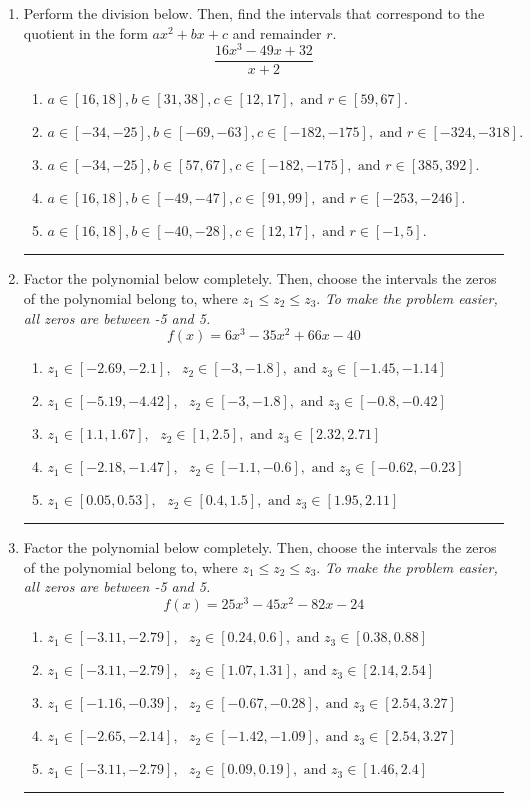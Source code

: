 \documentclass[14pt]{extbook}
\newcommand{\litem}[1]{\item#1\hspace*{-1cm}\rule{\textwidth}{0.4pt}}
\begin{document}
\begin{enumerate}
\litem{
Perform the division below. Then, find the intervals that correspond to the quotient in the form $ax^2+bx+c$ and remainder $r$.\[ \frac{16x^{3} -49 x + 32}{x + 2} \]\begin{enumerate}[label=\Alph*.]
\item \( a \in [16, 18], b \in [31, 38], c \in [12, 17], \text{ and } r \in [59, 67]. \)
\item \( a \in [-34, -25], b \in [-69, -63], c \in [-182, -175], \text{ and } r \in [-324, -318]. \)
\item \( a \in [-34, -25], b \in [57, 67], c \in [-182, -175], \text{ and } r \in [385, 392]. \)
\item \( a \in [16, 18], b \in [-49, -47], c \in [91, 99], \text{ and } r \in [-253, -246]. \)
\item \( a \in [16, 18], b \in [-40, -28], c \in [12, 17], \text{ and } r \in [-1, 5]. \)

\end{enumerate} }
\litem{
Factor the polynomial below completely. Then, choose the intervals the zeros of the polynomial belong to, where $z_1 \leq z_2 \leq z_3$. \textit{To make the problem easier, all zeros are between -5 and 5.}\[ f(x) = 6x^{3} -35 x^{2} +66 x -40 \]\begin{enumerate}[label=\Alph*.]
\item \( z_1 \in [-2.69, -2.1], \text{   }  z_2 \in [-3, -1.8], \text{   and   } z_3 \in [-1.45, -1.14] \)
\item \( z_1 \in [-5.19, -4.42], \text{   }  z_2 \in [-3, -1.8], \text{   and   } z_3 \in [-0.8, -0.42] \)
\item \( z_1 \in [1.1, 1.67], \text{   }  z_2 \in [1, 2.5], \text{   and   } z_3 \in [2.32, 2.71] \)
\item \( z_1 \in [-2.18, -1.47], \text{   }  z_2 \in [-1.1, -0.6], \text{   and   } z_3 \in [-0.62, -0.23] \)
\item \( z_1 \in [0.05, 0.53], \text{   }  z_2 \in [0.4, 1.5], \text{   and   } z_3 \in [1.95, 2.11] \)

\end{enumerate} }
\litem{
Factor the polynomial below completely. Then, choose the intervals the zeros of the polynomial belong to, where $z_1 \leq z_2 \leq z_3$. \textit{To make the problem easier, all zeros are between -5 and 5.}\[ f(x) = 25x^{3} -45 x^{2} -82 x -24 \]\begin{enumerate}[label=\Alph*.]
\item \( z_1 \in [-3.11, -2.79], \text{   }  z_2 \in [0.24, 0.6], \text{   and   } z_3 \in [0.38, 0.88] \)
\item \( z_1 \in [-3.11, -2.79], \text{   }  z_2 \in [1.07, 1.31], \text{   and   } z_3 \in [2.14, 2.54] \)
\item \( z_1 \in [-1.16, -0.39], \text{   }  z_2 \in [-0.67, -0.28], \text{   and   } z_3 \in [2.54, 3.27] \)
\item \( z_1 \in [-2.65, -2.14], \text{   }  z_2 \in [-1.42, -1.09], \text{   and   } z_3 \in [2.54, 3.27] \)
\item \( z_1 \in [-3.11, -2.79], \text{   }  z_2 \in [0.09, 0.19], \text{   and   } z_3 \in [1.46, 2.4] \)


\end{enumerate}}
\end{enumerate}
\end{document}
